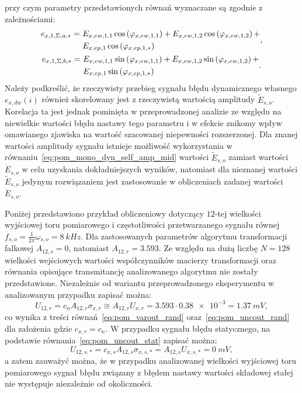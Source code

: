 przy czym parametry przedstawionych równań wyznaczane są zgodnie z zależnościami:
\begin{gather}
\begin{split}
e_{x,1,\Sigma,a,*} =~ & E_{x,ew,1,1} \cos \left(\varphi_{x,ew,1,1}\right) + E_{x,ew,1,2} \cos \left(\varphi_{x,ew,1,2}\right) + \\ & E_{x,ep,1} \cos \left(\varphi_{x,ep,1,*}\right)
\end{split}
\label{eq:pom_mono_dyn_sum_param_a_mid}, \\
\begin{split}
e_{x,1,\Sigma,b,*} =~ & E_{x,ew,1,1} \sin \left(\varphi_{x,ew,1,1}\right) + E_{x,ew,1,2} \sin \left(\varphi_{x,ew,1,2}\right) + \\ & E_{x,ep,1} \sin \left(\varphi_{x,ep,1,*}\right)
\end{split}
\label{eq:pom_mono_dyn_sum_param_b_mid}.
\end{gather}
Należy podkreślić, że rzeczywisty przebieg sygnału błędu dynamicznego własnego $e_{x,dw}(i)$ również skorelowany jest z rzeczywistą wartością amplitudy $\tilde{E}_{s,o}$. Korelacja ta jest jednak pominięta w przeprowadzonej analizie ze względu na niewielkie wartości błędu nastawy tego parametru i w efekcie znikomy wpływ omawianego zjawiska na wartość szacowanej niepewności rozszerzonej. Dla znanej wartości amplitudy sygnału istnieje możliwość wykorzystania w równaniu~\eqref{eq:pom_mono_dyn_self_amp_mid} wartości $\tilde{E}_{s,o}$ zamiast wartości $\dot{E}_{s,o}$ w celu uzyskania dokładniejszych wyników, natomiast dla nieznanej wartości $\tilde{E}_{s,o}$ jedynym rozwiązaniem jest zastosowanie w obliczeniach zadanej wartości $\dot{E}_{s,o}$.

Poniżej przedstawiono przykład obliczeniowy dotyczący $12$-tej wielkości wyjściowej toru pomiarowego i częstotliwości przetwarzanego sygnału równej $f_{s,o} = \frac{1}{2\pi} \omega_{s,o} = \qty{8}{kHz}$. Dla zastosowanych parametrów algorytmu transformacji falkowej $A_{12,s} = 0$, natomiast $A_{12,r} = 3.593$. Ze względu na dużą liczbę $N = 128$ wielkości wejściowych wartości współczynników macierzy transformacji oraz równania opisujące transmitancję analizowanego algorytmu nie zostały przedstawione. Niezależnie od wariantu przeprowadzonego eksperymentu w analizowanym przypadku zapisać można:
\begin{equation}
U_{12,r} = c_{n} A_{12,r} \sigma_{x,r} \cong A_{12,r} U_{x,r} = 3.593 \cdot \num{0.38e-3} = \qty{1.37}{mV} \label{eq:pom_mono_unc_rand_all},
\end{equation}
co wynika z treści równań~\eqref{eq:pom_varout_rand} oraz~\eqref{eq:pom_uncout_rand} dla założenia gdzie $c_{x,r} = c_{n}$. W przypadku sygnału błędu statycznego, na podstawie równania~\eqref{eq:pom_uncout_stat} zapisać można:
\begin{equation}
U_{12,s,*} = c_{x,s} A_{12,s} \sigma_{x,s,*} = A_{12,s} U_{x,s,*} = \qty{0}{mV} \label{eq:pom_mono_unc_static_all},
\end{equation}
a zatem zauważyć można, że w przypadku analizowanej wielkości wyjściowej toru pomiarowego sygnał błędu związany z błędem nastawy wartości składowej stałej nie występuje niezależnie od okoliczności.

